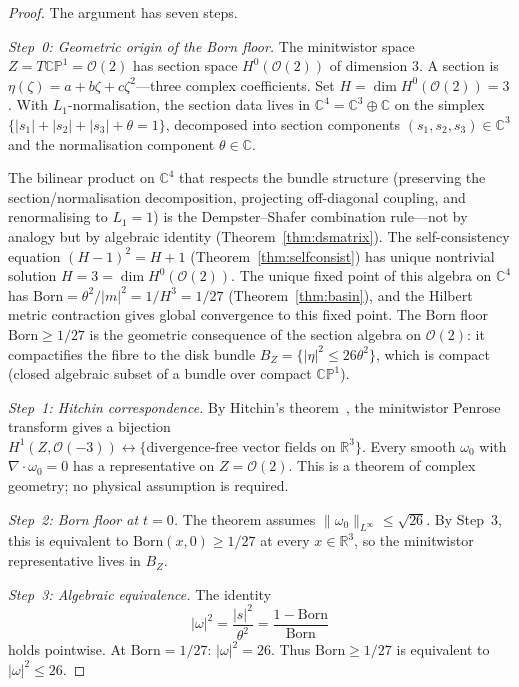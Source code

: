 \documentclass[11pt,a4paper]{article}
\theoremstyle{definition}
\theoremstyle{remark}
\newcommand{\CP}{\mathbb{CP}}
\newcommand{\C}{\mathbb{C}}
\newcommand{\R}{\mathbb{R}}
\begin{document}
\begin{proof}
The argument has seven steps.

\emph{Step~0: Geometric origin of the Born floor.} The minitwistor space $Z=T\CP^1=\mathcal{O}(2)$ has section space $H^0(\mathcal{O}(2))$ of dimension $3$. A section is $\eta(\zeta)=a+b\zeta+c\zeta^2$---three complex coefficients. Set $H=\dim H^0(\mathcal{O}(2))=3$. With $L_1$-normalisation, the section data lives in $\C^4=\C^3\oplus\C$ on the simplex $\{|s_1|+|s_2|+|s_3|+\theta=1\}$, decomposed into section components $(s_1,s_2,s_3)\in\C^3$ and the normalisation component $\theta\in\C$.

The bilinear product on $\C^4$ that respects the bundle structure (preserving the section/normalisation decomposition, projecting off-diagonal coupling, and renormalising to $L_1=1$) is the Dempster--Shafer combination rule---not by analogy but by algebraic identity (Theorem~\ref{thm:dsmatrix}). The self-consistency equation $(H-1)^2=H+1$ (Theorem~\ref{thm:selfconsist}) has unique nontrivial solution $H=3=\dim H^0(\mathcal{O}(2))$. The unique fixed point of this algebra on $\C^4$ has $\mathrm{Born}=\theta^2/|m|^2=1/H^3=1/27$ (Theorem~\ref{thm:basin}), and the Hilbert metric contraction gives global convergence to this fixed point. The Born floor $\mathrm{Born}\geq 1/27$ is the geometric consequence of the section algebra on $\mathcal{O}(2)$: it compactifies the fibre to the disk bundle $B_Z=\{|\eta|^2\leq 26\theta^2\}$, which is compact (closed algebraic subset of a bundle over compact $\CP^1$).

\emph{Step~1: Hitchin correspondence.} By Hitchin's theorem~\cite{Hitchin1982}, the minitwistor Penrose transform gives a bijection $H^1(Z,\mathcal{O}(-3))\leftrightarrow\{\text{divergence-free vector fields on }\R^3\}$. Every smooth $\omega_0$ with $\nabla\cdot\omega_0=0$ has a representative on $Z=\mathcal{O}(2)$. This is a theorem of complex geometry; no physical assumption is required.

\emph{Step~2: Born floor at $t=0$.} The theorem assumes $\|\omega_0\|_{L^\infty}\leq\sqrt{26}$. By Step~3, this is equivalent to $\mathrm{Born}(x,0)\geq 1/27$ at every $x\in\R^3$, so the minitwistor representative lives in $B_Z$.

\emph{Step~3: Algebraic equivalence.} The identity
\begin{equation}\label{eq:born_omega}
|\omega|^2=\frac{|s|^2}{\theta^2}=\frac{1-\mathrm{Born}}{\mathrm{Born}}
\end{equation}
holds pointwise. At $\mathrm{Born}=1/27$: $|\omega|^2=26$. Thus $\mathrm{Born}\geq 1/27$ is equivalent to $|\omega|^2\leq 26$.


\end{proof}
\end{document}
